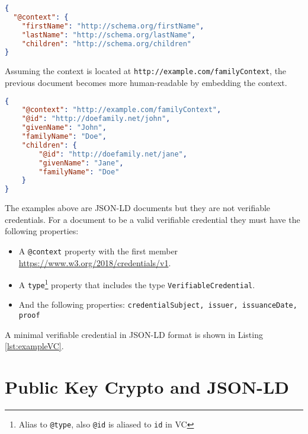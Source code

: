 \begin{lstlisting}[language=json, label={lst:exampleJSONLD}, caption={A context file}]
{
  "@context": {
    "firstName": "http://schema.org/firstName",
    "lastName": "http://schema.org/lastName",
    "children": "http://schema.org/children"
}
\end{lstlisting}

Assuming the context is located at \lstinline{http://example.com/familyContext}, the previous document becomes more human-readable by embedding the context.

\begin{lstlisting}[language=json, label={lst:exampleJSONLD}, caption={A context added JSON-LD with shortened terms}]
{
    "@context": "http://example.com/familyContext",
    "@id": "http://doefamily.net/john",
    "givenName": "John",
    "familyName": "Doe",
    "children": {
        "@id": "http://doefamily.net/jane",
        "givenName": "Jane",
        "familyName": "Doe"
    }
}
\end{lstlisting}

The examples above are \acrshort{JSON-LD} documents but they are not verifiable credentials. For a document to be a valid verifiable credential they must have the following properties:
\begin{itemize}
    \item A \lstinline{@context} property with the first member \url{https://www.w3.org/2018/credentials/v1}.
    \item A \lstinline{type}\footnote{Alias to \lstinline{@type}, also \lstinline{@id} is aliased to \lstinline{id} in \acrshort{VC}} property that includes the type \lstinline{VerifiableCredential}.
    \item And the following properties: \lstinline{credentialSubject, issuer, issuanceDate, proof}
\end{itemize}

A minimal verifiable credential in \acrshort{JSON-LD} format is shown in Listing \ref{lst:exampleVC}.





\section{Public Key Crypto and JSON-LD}

